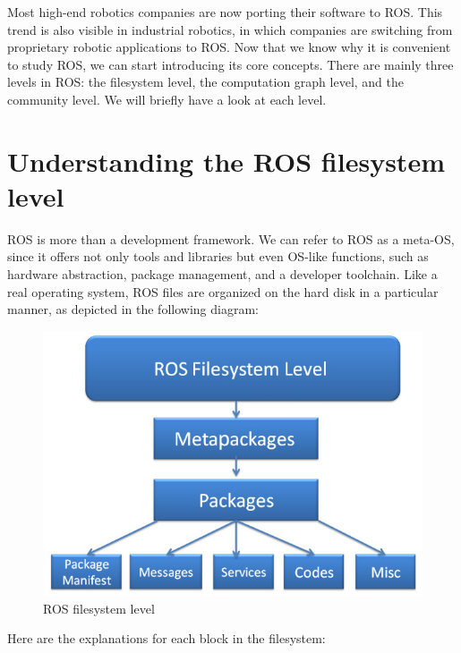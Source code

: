 \documentclass[../../main]{subfiles}
\begin{document}
Most high-end robotics companies are now porting their software to ROS.
This trend is also visible in industrial robotics, in which companies are switching from
proprietary robotic applications to ROS.
Now that we know why it is convenient to study ROS, we can start introducing its core
concepts. There are mainly three levels in ROS: the filesystem level, the computation graph
level, and the community level. We will briefly have a look at each level.

\section{Understanding the ROS filesystem level}
ROS is more than a development framework. We can refer to ROS as a meta-OS, since
it offers not only tools and libraries but even OS-like functions, such as hardware
abstraction, package management, and a developer toolchain. Like a real operating
system, ROS files are organized on the hard disk in a particular manner, as depicted in the
following diagram:
\begin{figure}[ht]
    \centering
    \includegraphics{img/filesystem.jpg}
    \caption{ROS filesystem level}
\end{figure}
Here are the explanations for each block in the filesystem:
\end{document}
